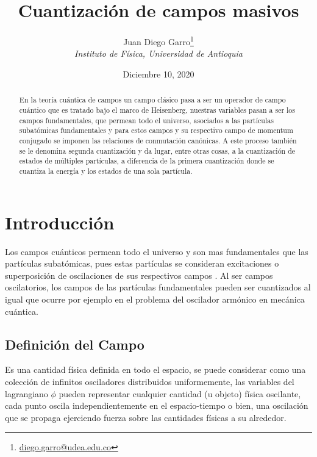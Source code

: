 \documentclass{article}
\title{Cuantización de campos masivos}
\author{Juan Diego Garro\footnote{\href{mailto:diego.garro@udea.edu.co}{diego.garro@udea.edu.co}}\\
\textit{\small  Instituto de Física, Universidad de Antioquia}
}
\date{\small Diciembre 10, 2020}
\begin{document}

\maketitle

\begin{abstract}
En la teoría cuántica de campos un campo clásico pasa a ser un operador de campo cuántico que es tratado bajo el marco de Heisenberg, nuestras variables pasan a ser los campos fundamentales, que permean todo el universo, asociados a las partículas subatómicas fundamentales y para estos campos y su respectivo campo de momentum conjugado se imponen las relaciones de conmutación canónicas. A este proceso también se le denomina segunda cuantización y da lugar, entre otras cosas, a la cuantización de estados de múltiples partículas, a diferencia de la primera cuantización donde se cuantiza la energía y los estados de una sola partícula.
\end{abstract}

\section{Introducción}
Los campos cuánticos permean todo el universo y son mas fundamentales que las partículas subatómicas, pues estas partículas se consideran excitaciones o superposición de oscilaciones de sus respectivos campos \cite{Restrepo:2020}. Al ser campos oscilatorios, los campos de las partículas fundamentales pueden ser cuantizados al igual que ocurre por ejemplo en el problema del oscilador armónico en mecánica cuántica.

\subsection{Definición del Campo}
Es una cantidad física definida en todo el espacio, se puede considerar como
una colección de infinitos osciladores distribuidos uniformemente, las variables del lagrangiano $\phi$ pueden representar cualquier cantidad (u objeto) física oscilante, cada punto oscila independientemente en el espacio-tiempo o bien, una oscilación que se propaga ejerciendo fuerza sobre las cantidades físicas a su alrededor.
\end{document}
